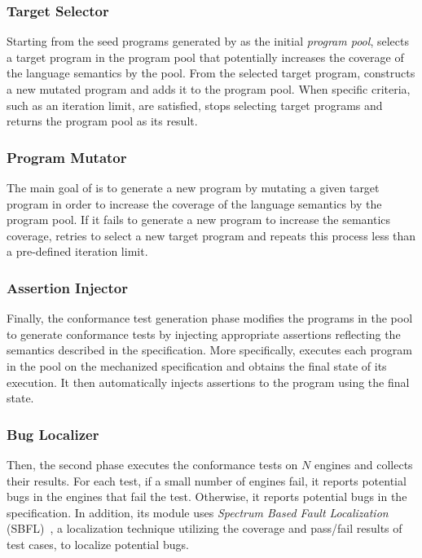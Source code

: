 \subsubsection{Target Selector}
Starting from the seed programs generated by 
as the initial \emph{program pool}, 
selects a target program in the program pool that potentially increases the
coverage of the language semantics by the pool.
From the selected target program,  constructs a new mutated program
and adds it to the program pool.  When specific criteria, such as an iteration limit, are satisfied,
 stops selecting target programs and returns
the program pool as its result.

\subsubsection{Program Mutator}
The main goal of  is to generate a new program by
mutating a given target program in order to increase the coverage of
the language semantics by the program pool.
If it fails to generate a new program to increase the semantics coverage,
 retries to select a new target program and repeats this
process less than a pre-defined iteration limit.

\subsubsection{Assertion Injector}
Finally, the conformance test generation phase modifies the programs in the pool to generate
conformance tests by injecting appropriate assertions reflecting the
semantics described in the specification.  More specifically,
 executes each program in the pool on the mechanized
specification and obtains the final state of its execution.  It then
automatically injects assertions to the program using the final state.

\subsubsection{Bug Localizer}
Then, the second phase executes the conformance tests on $N$ engines and
collects their results.  For each test, if a small number of engines fail,
it reports potential bugs in the engines that fail the test.
Otherwise, it reports potential bugs in the specification.
In addition, its  module uses \textit{Spectrum
Based Fault Localization} (SBFL)~\cite{sbfl-survey}, a localization
technique utilizing the coverage and pass/fail results of test cases, to
localize potential bugs.
